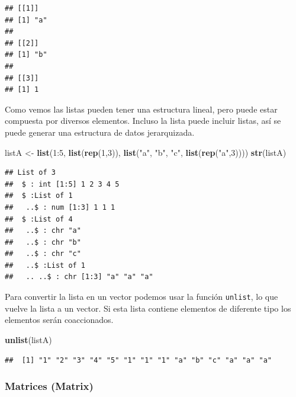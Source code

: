 \documentclass[]{article}
\newenvironment{Shaded}{\begin{snugshade}}{\end{snugshade}}
\newcommand{\KeywordTok}[1]{\textcolor[rgb]{0.13,0.29,0.53}{\textbf{{#1}}}}
\newcommand{\DecValTok}[1]{\textcolor[rgb]{0.00,0.00,0.81}{{#1}}}
\newcommand{\StringTok}[1]{\textcolor[rgb]{0.31,0.60,0.02}{{#1}}}
\newcommand{\NormalTok}[1]{{#1}}
\begin{document}
\begin{verbatim}
## [[1]]
## [1] "a"
## 
## [[2]]
## [1] "b"
## 
## [[3]]
## [1] 1
\end{verbatim}

Como vemos las listas pueden tener una estructura lineal, pero puede
estar compuesta por diversos elementos. Incluso la lista puede incluir
listas, así se puede generar una estructura de datos jerarquizada.

\begin{Shaded}
\begin{Highlighting}[]
\NormalTok{listA <-}\StringTok{ }\KeywordTok{list}\NormalTok{(}\DecValTok{1}\NormalTok{:}\DecValTok{5}\NormalTok{, }\KeywordTok{list}\NormalTok{(}\KeywordTok{rep}\NormalTok{(}\DecValTok{1}\NormalTok{,}\DecValTok{3}\NormalTok{)), }\KeywordTok{list}\NormalTok{(}\StringTok{"a"}\NormalTok{, }\StringTok{"b"}\NormalTok{, }\StringTok{"c"}\NormalTok{, }\KeywordTok{list}\NormalTok{(}\KeywordTok{rep}\NormalTok{(}\StringTok{"a"}\NormalTok{,}\DecValTok{3}\NormalTok{))))}
\KeywordTok{str}\NormalTok{(listA)}
\end{Highlighting}
\end{Shaded}

\begin{verbatim}
## List of 3
##  $ : int [1:5] 1 2 3 4 5
##  $ :List of 1
##   ..$ : num [1:3] 1 1 1
##  $ :List of 4
##   ..$ : chr "a"
##   ..$ : chr "b"
##   ..$ : chr "c"
##   ..$ :List of 1
##   .. ..$ : chr [1:3] "a" "a" "a"
\end{verbatim}

Para convertir la lista en un vector podemos usar la función
\texttt{unlist}, lo que vuelve la lista a un vector. Si esta lista
contiene elementos de diferente tipo los elementos serán coaccionados.

\begin{Shaded}
\begin{Highlighting}[]
\KeywordTok{unlist}\NormalTok{(listA)}
\end{Highlighting}
\end{Shaded}

\begin{verbatim}
##  [1] "1" "2" "3" "4" "5" "1" "1" "1" "a" "b" "c" "a" "a" "a"
\end{verbatim}

\subsubsection{Matrices (Matrix)}\label{matrices-matrix}
\end{document}
